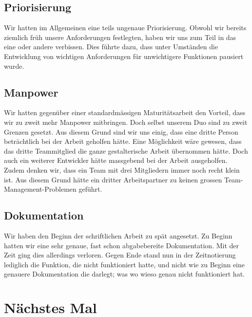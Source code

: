 \subsection*{Priorisierung}
Wir hatten im Allgemeinen eine teils ungenaue Priorisierung. Obwohl wir bereits ziemlich früh unsere Anforderungen festlegten, haben wir uns zum Teil in das eine oder andere verbissen.
Dies führte dazu, dass unter Umständen die Entwicklung von wichtigen Anforderungen für unwichtigere Funktionen pausiert wurde. 


\subsection*{Manpower} \label{chap:neusm}
Wir hatten gegenüber einer standardmässigen Maturitätsarbeit den Vorteil, dass wir zu zweit mehr Manpower mitbringen. Doch selbst unserem Duo sind zu zweit Grenzen gesetzt.
Aus diesem Grund sind wir uns einig, dass eine dritte Person beträchtlich bei der Arbeit geholfen hätte. Eine Möglichkeit wäre gewesen, dass das dritte Teammitglied die ganze
gestalterische Arbeit übernommen hätte. Doch auch ein weiterer Entwickler hätte massgebend bei der Arbeit ausgeholfen. Zudem denken wir, dass ein Team mit drei Mitgliedern
immer noch recht klein ist. Aus diesem Grund hätte ein dritter Arbeitspartner zu keinen grossen Team-Management-Problemen geführt.


\subsection*{Dokumentation}
Wir haben den Beginn der schriftlichen Arbeit zu spät angesetzt. Zu Beginn hatten wir eine sehr genaue, fast schon abgabebereite Dokumentation. Mit der Zeit ging dies allerdings verloren.
Gegen Ende stand nun in der Zeitnotierung lediglich die Funktion, die nicht funktioniert hatte, und nicht wie zu Beginn eine genauere Dokumentation die darlegt; was wo wieso genau nicht funktioniert hat.

\section{Nächstes Mal}


